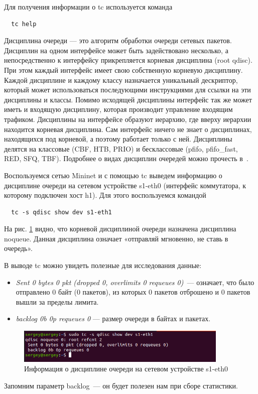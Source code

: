 Для получения информации о tc используется команда
\begin{verbatim}
  tc help
\end{verbatim}

Дисциплина очереди --- это алгоритм обработки очереди сетевых пакетов.
Дисциплин на одном интерфейсе может быть задействовано несколько, а
непосредственно к интерфейсу прикрепляется корневая дисциплина (root qdisc).
При этом каждый интерфейс имеет свою собственную корневую дисциплину.
Каждой дисциплине и каждому классу назначается уникальный дескриптор,
который может использоваться последующими инструкциями для ссылки на эти
дисциплины и классы. Помимо исходящей дисциплины интерфейс так же может
иметь и входящую дисциплину, которая производит управление входящим
трафиком. Дисциплины на интерфейсе образуют иерархию, где вверху
иерархии находится корневая дисциплина. Сам интерфейс ничего не знает о
дисциплинах, находящихся под корневой, а поэтому работает только с ней.
Дисциплины делятся на классовые (CBF, HTB, PRIO) и бесклассовые (pfifo,
pfifo\_fast, RED, SFQ, TBF). Подробнее о видах дисциплин очередей можно
прочесть в~\cite{tc}.

Воспользуемся сетью Mininet и с помощью tc выведем информацию о
дисциплине очереди на сетевом устройстве s1-eth0 (интерфейс
коммутатора, к которому подключен хост h1). Для этого воспользуемся
командой
\begin{verbatim}
  tc -s qdisc show dev s1-eth1
\end{verbatim}

На рис. \ref{fig:0020} видно, что корневой дисциплиной очереди назначена
дисциплина noqueue. Данная дисциплина означает «отправляй мгновенно, не
ставь в очередь».


В выводе tc можно увидеть полезные для исследования данные:
\begin{itemize}
\item \emph{Sent 0 bytes 0 pkt (dropped 0, overlimits 0 requeues
    0)}~--- означает, что было отправлено 0 байт (0 пакетов), из
  которых 0 пакетов отброшено и 0 пакетов вышли за пределы лимита.
\item \emph{backlog 0b 0p requeues 0} --- размер очереди в байтах и
  пакетах.
\end{itemize}

\begin{figure}[!h]
\centering
\includegraphics[width=0.9\textwidth]{image/iproute_tc_qdisc_show_s1-eth1.png}
\caption{Информация о дисциплине очереди на сетевом устройстве
  s1-eth0}
\label{fig:0020}
\end{figure}


Запомним параметр backlog~--- он будет полезен нам при сборе
статистики.
